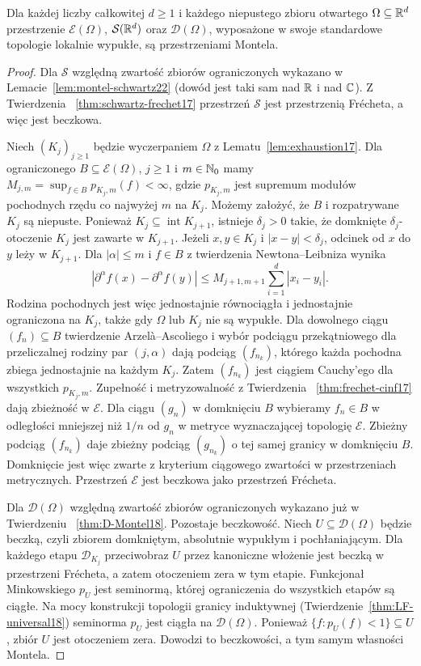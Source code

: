 \begin{twierdzenie}
\label{thm:montel-test23}
Dla każdej liczby całkowitej $d\ge1$ i każdego
niepustego zbioru otwartego $\Omega\subseteq\mathbb R^d$
przestrzenie $\mathcal E(\Omega)$,
$\mathcal S(\mathbb R^d)$ oraz $\mathcal D(\Omega)$, wyposażone
w swoje standardowe topologie lokalnie wypukłe, są przestrzeniami
Montela.
\end{twierdzenie}
\begin{proof}
Dla $\mathcal S$ względną zwartość zbiorów ograniczonych
wykazano w Lemacie~\ref{lem:montel-schwartz22} (dowód
jest taki sam nad $\mathbb R$ i nad $\mathbb C$). Z Twierdzenia~
\ref{thm:schwartz-frechet17} przestrzeń $\mathcal S$
jest przestrzenią Frécheta, a więc jest beczkowa.

Niech $(K_j)_{j\ge1}$ będzie wyczerpaniem $\Omega$
z Lematu~\ref{lem:exhaustion17}.
Dla ograniczonego $B\subseteq\mathcal E(\Omega)$,
$j\ge1$ i $m\in\mathbb N_0$ mamy
$M_{j,m}=\sup_{f\in B}p_{K_j,m}(f)<\infty$,
gdzie $p_{K_j,m}$ jest supremum modułów pochodnych
rzędu co najwyżej $m$ na $K_j$. Możemy założyć,
że $B$ i rozpatrywane $K_j$ są niepuste.
Ponieważ $K_j\subseteq\operatorname{int}K_{j+1}$,
istnieje $\delta_j>0$ takie, że domknięte
$\delta_j$-otoczenie $K_j$ jest zawarte w $K_{j+1}$.
Jeżeli $x,y\in K_j$ i $|x-y|<\delta_j$, odcinek
od $x$ do $y$ leży w $K_{j+1}$. Dla $|\alpha|\le m$
i $f\in B$ z twierdzenia Newtona--Leibniza wynika
\[
 |\partial^\alpha f(x)-\partial^\alpha f(y)|
 \le M_{j+1,m+1}\sum_{i=1}^d|x_i-y_i|.
\]
Rodzina pochodnych jest więc jednostajnie równociągła
i jednostajnie ograniczona na $K_j$, także gdy
$\Omega$ lub $K_j$ nie są wypukłe.
Dla dowolnego ciągu $(f_n)\subseteq B$ twierdzenie
Arzelà--Ascoliego i wybór podciągu przekątniowego
dla przeliczalnej rodziny par $(j,\alpha)$ dają
podciąg $(f_{n_k})$, którego każda pochodna zbiega
jednostajnie na każdym $K_j$. Zatem $(f_{n_k})$
jest ciągiem Cauchy'ego dla wszystkich $p_{K_j,m}$.
Zupełność i metryzowalność z Twierdzenia~
\ref{thm:frechet-cinf17} dają zbieżność w $\mathcal E$.
Dla ciągu $(g_n)$ w domknięciu $B$ wybieramy
$f_n\in B$ w odległości mniejszej niż $1/n$ od $g_n$
w metryce wyznaczającej topologię $\mathcal E$.
Zbieżny podciąg $(f_{n_k})$ daje zbieżny podciąg
$(g_{n_k})$ o tej samej granicy w domknięciu $B$.
Domknięcie jest więc zwarte z kryterium ciągowego
zwartości w przestrzeniach metrycznych.
Przestrzeń $\mathcal E$ jest beczkowa jako przestrzeń Frécheta.

Dla $\mathcal D(\Omega)$ względną zwartość zbiorów
ograniczonych wykazano już w Twierdzeniu~
\ref{thm:D-Montel18}. Pozostaje beczkowość.
Niech $U\subseteq\mathcal D(\Omega)$ będzie beczką,
czyli zbiorem domkniętym, absolutnie wypukłym i pochłaniającym.
Dla każdego etapu $\mathcal D_{K_j}$ przeciwobraz $U$
przez kanoniczne włożenie jest beczką w przestrzeni
Frécheta, a zatem otoczeniem zera w tym etapie.
Funkcjonał Minkowskiego $p_U$ jest seminormą, której
ograniczenia do wszystkich etapów są ciągłe.
Na mocy konstrukcji topologii granicy induktywnej
(Twierdzenie~\ref{thm:LF-universal18}) seminorma
$p_U$ jest ciągła na $\mathcal D(\Omega)$.
Ponieważ $\{f:p_U(f)<1\}\subseteq U$, zbiór $U$
jest otoczeniem zera. Dowodzi to beczkowości,
a tym samym własności Montela.
\end{proof}

